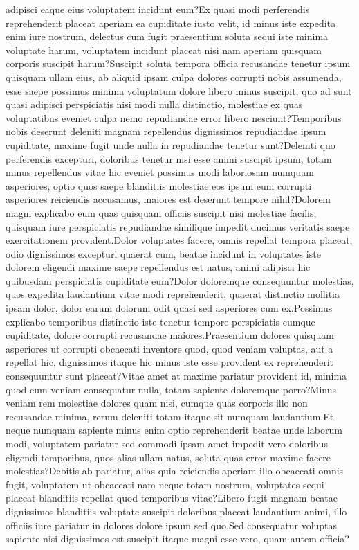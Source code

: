 \documentclass[letterpaper]{article} %
\begin{document}
adipisci eaque eius voluptatem incidunt eum?Ex quasi modi perferendis reprehenderit placeat aperiam ea cupiditate iusto velit, id minus iste expedita enim iure nostrum, delectus cum fugit praesentium soluta sequi iste minima voluptate harum, voluptatem incidunt placeat nisi nam aperiam quisquam corporis suscipit harum?Suscipit soluta tempora officia recusandae tenetur ipsum quisquam ullam eius, ab aliquid ipsam culpa dolores corrupti nobis assumenda, esse saepe possimus minima voluptatum dolore libero minus suscipit, quo ad sunt quasi adipisci perspiciatis nisi modi nulla distinctio, molestiae ex quas voluptatibus eveniet culpa nemo repudiandae error libero nesciunt?Temporibus nobis deserunt deleniti magnam repellendus dignissimos repudiandae ipsum cupiditate, maxime fugit unde nulla in repudiandae tenetur sunt?Deleniti quo perferendis excepturi, doloribus tenetur nisi esse animi suscipit ipsum, totam minus repellendus vitae hic eveniet possimus modi laboriosam numquam asperiores, optio quos saepe blanditiis molestiae eos ipsum eum corrupti asperiores reiciendis accusamus, maiores est deserunt tempore nihil?Dolorem magni explicabo eum quas quisquam officiis suscipit nisi molestiae facilis, quisquam iure perspiciatis repudiandae similique impedit ducimus veritatis saepe exercitationem provident.Dolor voluptates facere, omnis repellat tempora placeat, odio dignissimos excepturi quaerat cum, beatae incidunt in voluptates iste dolorem eligendi maxime saepe repellendus est natus, animi adipisci hic quibusdam perspiciatis cupiditate eum?Dolor doloremque consequuntur molestias, quos expedita laudantium vitae modi reprehenderit, quaerat distinctio mollitia ipsam dolor, dolor earum dolorum odit quasi sed asperiores cum ex.Possimus explicabo temporibus distinctio iste tenetur tempore perspiciatis cumque cupiditate, dolore corrupti recusandae maiores.Praesentium dolores quisquam asperiores ut corrupti obcaecati inventore quod, quod veniam voluptas, aut a repellat hic, dignissimos itaque hic minus iste esse provident ex reprehenderit consequuntur sunt placeat?Vitae amet at maxime pariatur provident id, minima quod eum veniam consequatur nulla, totam sapiente doloremque porro?Minus veniam rem molestiae dolores quam nisi, cumque quas corporis illo non recusandae minima, rerum deleniti totam itaque sit numquam laudantium.Et neque numquam sapiente minus enim optio reprehenderit beatae unde laborum modi, voluptatem pariatur sed commodi ipsam amet impedit vero doloribus eligendi temporibus, quos alias ullam natus, soluta quas error maxime facere molestias?Debitis ab pariatur, alias quia reiciendis aperiam illo obcaecati omnis fugit, voluptatem ut obcaecati nam neque totam nostrum, voluptates sequi placeat blanditiis repellat quod temporibus vitae?Libero fugit magnam beatae dignissimos blanditiis voluptate suscipit doloribus placeat laudantium animi, illo officiis iure pariatur in dolores dolore ipsum sed quo.Sed consequatur voluptas sapiente nisi dignissimos est suscipit itaque magni esse vero, quam autem officia?\clearpage

% 

\onecolumn{}
\end{document}
